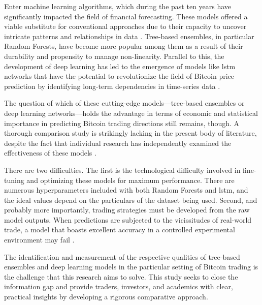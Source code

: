 \smallskip

Enter machine learning algorithms, which during the past ten years have significantly impacted the field of financial forecasting. These models offered a viable substitute for conventional approaches due to their capacity to uncover intricate patterns and relationships in data \citep{brownlee2018introduction}. Tree-based ensembles, in particular Random Forests, have become more popular among them as a result of their durability and propensity to manage non-linearity. Parallel to this, the development of deep learning has led to the emergence of models like \gls{lstm} networks that have the potential to revolutionize the field of Bitcoin price prediction by identifying long-term dependencies in time-series data \citep{10.5555/3203489}.

\smallskip

The question of which of these cutting-edge models—tree-based ensembles or deep learning networks—holds the advantage in terms of economic and statistical importance in predicting Bitcoin trading directions still remains, though. A thorough comparison study is strikingly lacking in the present body of literature, despite the fact that individual research has independently examined the effectiveness of these models \citep{johnson2020deep}.

\smallskip

There are two difficulties. The first is the technological difficulty involved in fine-tuning and optimizing these models for maximum performance. There are numerous hyperparameters included with both Random Forests and \gls{lstm}, and the ideal values depend on the particulars of the dataset being used. Second, and probably more importantly, trading strategies must be developed from the raw model outputs. When predictions are subjected to the vicissitudes of real-world trade, a model that boasts excellent accuracy in a controlled experimental environment may fail \citep{Goodfellow-et-al-2016}.

\smallskip

The identification and measurement of the respective qualities of tree-based ensembles and deep learning models in the particular setting of Bitcoin trading is the challenge that this research aims to solve. This study seeks to close the information gap and provide traders, investors, and academics with clear, practical insights by developing a rigorous comparative approach.

\goodbreak
